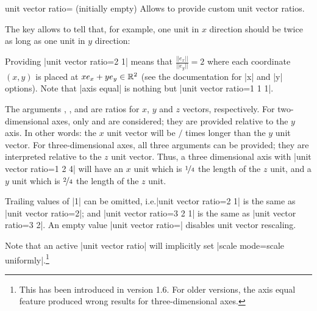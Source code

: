 \begin{pgfplotskey}{unit vector ratio= (initially empty)}
    Allows to provide custom unit vector ratios.

    The key allows to tell \PGFPlots{} that, for example, one unit in $x$
    direction should be twice as long as one unit in $y$ direction:
\begin{codeexample}[]
\end{codeexample}
    \noindent Providing |unit vector ratio=2 1| means that
    $\frac{||e_x||}{||e_y||} = 2$ where each coordinate $(x,y)$ is placed at $x
    e_x + y e_y \in \mathbb{R}^2$ (see the documentation for |x| and |y| options). Note
    that |axis equal| is nothing but |unit vector ratio=1 1 1|.

    The arguments , , and  are ratios for $x$, $y$
    and $z$ vectors, respectively. For two-dimensional axes, only  and
     are considered; they are provided relative to the $y$ axis. In
    other words: the $x$ unit vector will be $/$ times
    longer than the $y$ unit vector. For three-dimensional axes, all three
    arguments can be provided; they are interpreted relative to the $z$ unit
    vector. Thus, a three dimensional axis with |unit vector ratio=1 2 4| will
    have an $x$ unit which is $\nicefrac 14$ the length of the $z$ unit, and a
    $y$ unit which is $\nicefrac24$ the length of the $z$ unit.

    Trailing values of |1| can be omitted, i.e.\@ |unit vector ratio=2 1| is
    the same as |unit vector ratio=2|; and |unit vector ratio=3 2 1| is the
    same as |unit vector ratio=3 2|. An empty value |unit vector ratio={}|
    disables unit vector rescaling.

    Note that an active |unit vector ratio| will implicitly set
    |scale mode=scale uniformly|.\footnote{This has been introduced in version
    1.6. For older versions, the axis equal feature produced wrong results for
    three-dimensional axes.}


\end{pgfplotskey}
